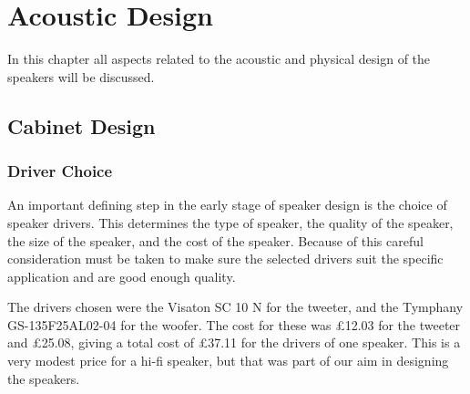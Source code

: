 \documentclass[main.tex]{subfiles}
\begin{document}
\chapter{Acoustic Design}
In this chapter all aspects related to the acoustic and physical design of the speakers will be discussed.
\section{Cabinet Design}
\subsection{Driver Choice}
An important defining step in the early stage of speaker design is the choice of speaker drivers. 
This determines the type of speaker, the quality of the speaker, the size of the speaker, and the cost of the speaker.
Because of this careful consideration must be taken to make sure the selected drivers suit the specific application and are good enough quality.

The drivers chosen were the Visaton SC 10 N\cite{tweeter} for the tweeter, and the Tymphany GS-135F25AL02-04\cite{woofer} for the woofer.
The cost for these was £12.03 for the tweeter and £25.08, giving a total cost of £37.11 for the drivers of one speaker.
This is a very modest price for a hi-fi speaker, but that was part of our aim in designing the speakers.
\end{document}

